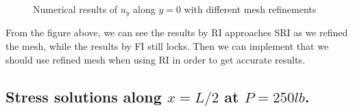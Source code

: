\documentclass{article}
\begin{document}
\begin{figure}[H]
    \centering
    \qquad
    \qquad
    \caption{Numerical results of $u_y$ along $y = 0$ with different mesh refinements}
\end{figure}

From the figure above, we can see the results by RI approaches SRI as we refined the mesh, while the results by FI still locks. Then we can implement that we should use refined mesh when using RI in order to get accurate results.


\vspace*{0.5em}
\subsection{Stress solutions along $x = L/2$ at $P = 250 lb$.}
\vspace*{0.5em}
\end{document}
